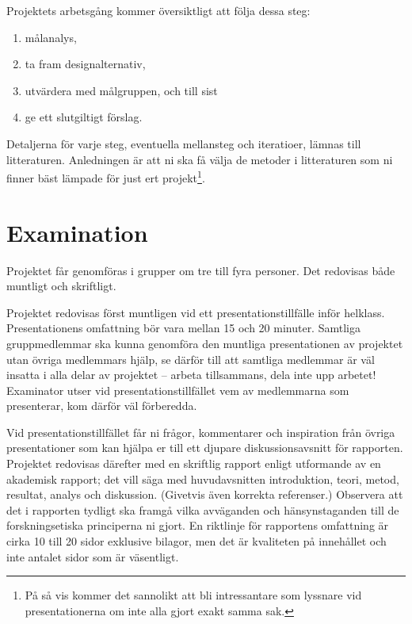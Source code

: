 \documentclass[a4paper,logo,nocourse]{miunasgn}
\begin{document}
Projektets arbetsgång kommer översiktligt att följa dessa steg:
\begin{enumerate}
	\item målanalys,
  \item ta fram designalternativ,
	\item utvärdera med målgruppen, och till sist
	\item ge ett slutgiltigt förslag.
\end{enumerate}
Detaljerna för varje steg, eventuella mellansteg och iteratioer, lämnas till 
litteraturen.
Anledningen är att ni ska få välja de metoder i litteraturen som ni finner bäst 
lämpade för just ert projekt\footnote{%
	På så vis kommer det sannolikt att bli intressantare som lyssnare vid 
	presentationerna om inte alla gjort exakt samma sak.
}.


\section{Examination}
\label{sec:Examination}
Projektet får genomföras i grupper om tre till fyra personer.
Det redovisas både muntligt och skriftligt.

Projektet redovisas först muntligen vid ett presentationstillfälle inför 
helklass.
Presentationens omfattning bör vara mellan 15 och 20 minuter.
Samtliga gruppmedlemmar ska kunna genomföra den muntliga presentationen av 
projektet utan övriga medlemmars hjälp, se därför till att samtliga medlemmar 
är väl insatta i alla delar av projektet -- arbeta tillsammans, dela inte upp 
arbetet!
Examinator utser vid presentationstillfället vem av medlemmarna som 
presenterar, kom därför väl förberedda.

Vid presentationstillfället får ni frågor, kommentarer och inspiration från 
övriga presentationer som kan hjälpa er till ett djupare diskussionsavsnitt för 
rapporten.
Projektet redovisas därefter med en skriftlig rapport enligt utformande av en 
akademisk rapport; det vill säga med huvudavsnitten introduktion, teori, metod, 
resultat, analys och diskussion.
(Givetvis även korrekta referenser.)
Observera att det i rapporten tydligt ska framgå vilka avväganden och 
hänsynstaganden till de forskningsetiska principerna ni gjort.
En riktlinje för rapportens omfattning är cirka 10 till 20 sidor exklusive 
bilagor, men det är kvaliteten på innehållet och inte antalet sidor som är 
väsentligt.
\end{document}
